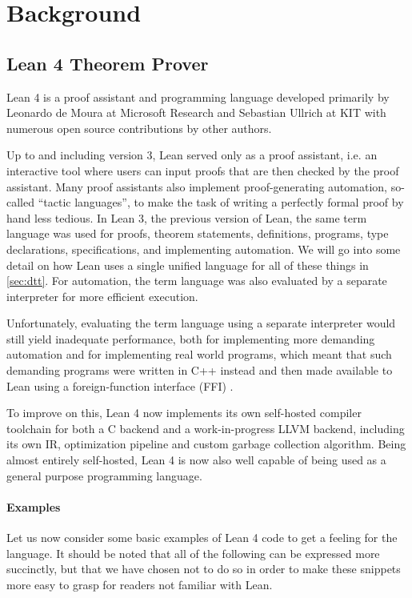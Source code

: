 \chapter{Background}\label{sec:background}

\section{Lean 4 Theorem Prover}\label{sec:lean4}
Lean 4 is a proof assistant and programming language developed primarily by Leonardo de Moura at Microsoft Research and Sebastian Ullrich at KIT with numerous open source contributions by other authors.

Up to and including version 3, Lean served only as a proof assistant, i.e. an interactive tool where users can input proofs that are then checked by the proof assistant. Many proof assistants also implement proof-generating automation, so-called ``tactic languages'', to make the task of writing a perfectly formal proof by hand less tedious. In Lean 3, the previous version of Lean, the same term language was used for proofs, theorem statements, definitions, programs, type declarations, specifications, and implementing automation. We will go into some detail on how Lean uses a single unified language for all of these things in \cref{sec:dtt}. For automation, the term language was also evaluated by a separate interpreter for more efficient execution.

Unfortunately, evaluating the term language using a separate interpreter would still yield inadequate performance, both for implementing more demanding automation and for implementing real world programs, which meant that such demanding programs were written in C++ instead and then made available to Lean using a foreign-function interface (FFI) \citep{ullrich_counting_2020}.

To improve on this, Lean 4 now implements its own self-hosted compiler toolchain for both a C backend and a work-in-progress LLVM backend, including its own IR, optimization pipeline and custom garbage collection algorithm. Being almost entirely self-hosted, Lean 4 is now also well capable of being used as a general purpose programming language.

\subsubsection{Examples}
Let us now consider some basic examples of Lean 4 code to get a feeling for the language. It should be noted that all of the following can be expressed more succinctly, but that we have chosen not to do so in order to make these snippets more easy to grasp for readers not familiar with Lean.

